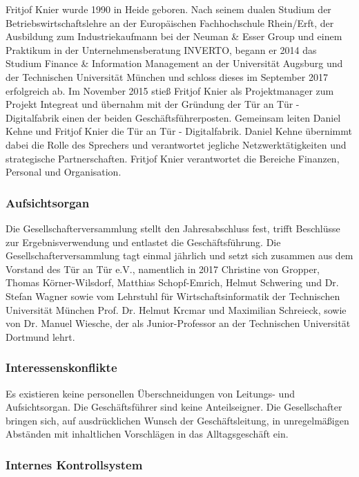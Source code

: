\documentclass[12pt, a4paper]{article} %
\begin{document}
Fritjof Knier wurde 1990 in Heide geboren. Nach seinem dualen Studium
der Betriebswirtschaftslehre an der Europäischen Fachhochschule
Rhein/Erft, der Ausbildung zum Industriekaufmann bei der Neuman \& Esser
Group und einem Praktikum in der Unternehmensberatung INVERTO, begann er
2014 das Studium Finance \& Information Management an der Universität
Augsburg und der Technischen Universität München und schloss dieses im
September 2017 erfolgreich ab. Im November 2015 stieß Fritjof Knier als
Projektmanager zum Projekt Integreat und übernahm mit der Gründung der
Tür an Tür - Digitalfabrik einen der beiden Geschäftsführerposten.
Gemeinsam leiten Daniel Kehne und Fritjof Knier die Tür an Tür -
Digitalfabrik. Daniel Kehne übernimmt dabei die Rolle des Sprechers und
verantwortet jegliche Netzwerktätigkeiten und strategische
Partnerschaften. Fritjof Knier verantwortet die Bereiche Finanzen,
Personal und Organisation.

\hypertarget{aufsichtsorgan}{%
\subsubsection{Aufsichtsorgan}\label{aufsichtsorgan}}

Die Gesellschafterversammlung stellt den Jahresabschluss fest, trifft
Beschlüsse zur Ergebnisverwendung und entlastet die Geschäftsführung.
Die Gesellschafterversammlung tagt einmal jährlich und setzt sich
zusammen aus dem Vorstand des Tür an Tür e.V., namentlich in 2017
Christine von Gropper, Thomas Körner-Wilsdorf, Matthias Schopf-Emrich,
Helmut Schwering und Dr. Stefan Wagner sowie vom Lehrstuhl für
Wirtschaftsinformatik der Technischen Universität München Prof. Dr.
Helmut Krcmar und Maximilian Schreieck, sowie von Dr. Manuel Wiesche,
der als Junior-Professor an der Technischen Universität Dortmund lehrt.

\hypertarget{interessenskonflikte}{%
\subsubsection{Interessenskonflikte}\label{interessenskonflikte}}

Es existieren keine personellen Überschneidungen von Leitungs- und
Aufsichtsorgan. Die Geschäftsführer sind keine Anteilseigner. Die
Gesellschafter bringen sich, auf ausdrücklichen Wunsch der
Geschäftsleitung, in unregelmäßigen Abständen mit inhaltlichen
Vorschlägen in das Alltagsgeschäft ein.

\hypertarget{internes-kontrollsystem}{%
\subsubsection{Internes
Kontrollsystem}\label{internes-kontrollsystem}}
\end{document}
